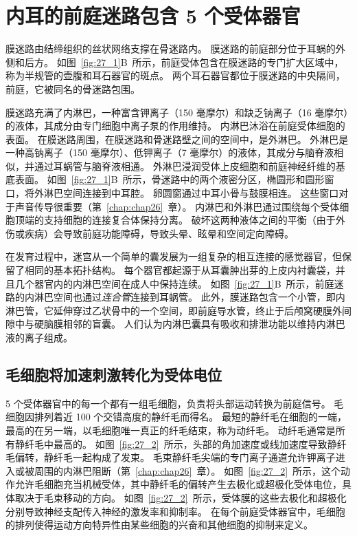 \section{内耳的前庭迷路包含 5 个受体器官}

膜迷路由结缔组织的丝状网络支撑在骨迷路内。
膜迷路的前庭部分位于耳蜗的外侧和后方。
如图~\ref{fig:27_1}B~所示，前庭受体包含在膜迷路的专门扩大区域中，称为半规管的壶腹和耳石器官的斑点。
两个耳石器官都位于膜迷路的中央隔间，前庭，它被同名的骨迷路包围。


膜迷路充满了内淋巴，一种富含钾离子（150 毫摩尔）和缺乏钠离子（16 毫摩尔）的液体，其成分由专门细胞中离子泵的作用维持。
内淋巴沐浴在前庭受体细胞的表面。
在膜迷路周围，在膜迷路和骨迷路壁之间的空间中，是外淋巴。
外淋巴是一种高钠离子（150 毫摩尔）、低钾离子（7 毫摩尔）的液体，其成分与脑脊液相似，并通过耳蜗管与脑脊液相通。
外淋巴浸润受体上皮细胞和前庭神经纤维的基底表面。
如图~\ref{fig:27_1}B~所示，骨迷路中的两个液密分区，椭圆形和圆形窗口，将外淋巴空间连接到中耳腔。
卵圆窗通过中耳小骨与鼓膜相连。
这些窗口对于声音传导很重要（第~\ref{chap:chap26}~章）。
内淋巴和外淋巴通过围绕每个受体细胞顶端的支持细胞的连接复合体保持分离。
破坏这两种液体之间的平衡（由于外伤或疾病）会导致前庭功能障碍，导致头晕、眩晕和空间定向障碍。


在发育过程中，迷宫从一个简单的囊发展为一组复杂的相互连接的感觉器官，但保留了相同的基本拓扑结构。
每个器官都起源于从耳囊肿出芽的上皮内衬囊袋，并且几个器官内的内淋巴空间在成人中保持连续。
如图~\ref{fig:27_1}B~所示，前庭迷路的内淋巴空间也通过\textit{连合管}连接到耳蜗管。
此外，膜迷路包含一个小管，即内淋巴管，它延伸穿过乙状骨中的一个空间，即前庭导水管，终止于后颅窝硬膜外间隙中与硬脑膜相邻的盲囊。
人们认为内淋巴囊具有吸收和排泄功能以维持内淋巴液的离子组成。



\subsection{毛细胞将加速刺激转化为受体电位}

5 个受体器官中的每一个都有一组毛细胞，负责将头部运动转换为前庭信号。
毛细胞因排列着近 100 个交错高度的静纤毛而得名。
最短的静纤毛在细胞的一端，最高的在另一端，以毛细胞唯一真正的纤毛结束，称为动纤毛。
动纤毛通常是所有静纤毛中最高的。
如图~\ref{fig:27_2}~所示，头部的角加速度或线加速度导致静纤毛偏转，静纤毛一起构成了发束。
毛束静纤毛尖端的专门离子通道允许钾离子进入或被周围的内淋巴阻断（第~\ref{chap:chap26}~章）。
如图~\ref{fig:27_2}~所示，这个动作允许毛细胞充当机械受体，其中静纤毛的偏转产生去极化或超极化受体电位，具体取决于毛束移动的方向。
如图~\ref{fig:27_2}~所示，受体膜的这些去极化和超极化分别导致神经支配传入神经的激发率和抑制率。
在每个前庭受体器官中，毛细胞的排列使得运动方向特异性由某些细胞的兴奋和其他细胞的抑制来定义。


